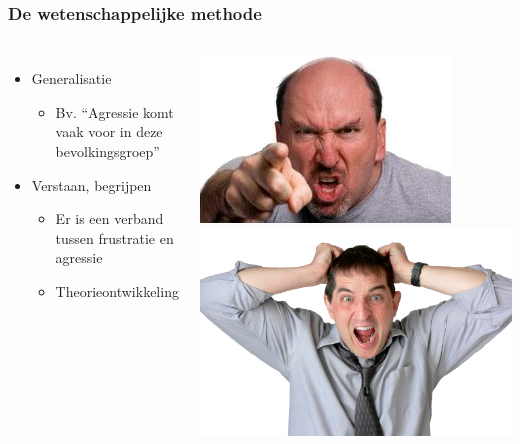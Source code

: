 \documentclass{beamer}
\begin{document}
\begin{frame}
  \frametitle{De wetenschappelijke methode}

  \begin{columns}[c]

    \begin{itemize}
      \item Generalisatie
        \begin{itemize}
          \item Bv. ``Agressie komt vaak voor in deze bevolkingsgroep''
        \end{itemize}
      \item Verstaan, begrijpen
        \begin{itemize}
          \item Er is een verband tussen frustratie en agressie
          \item Theorieontwikkeling
        \end{itemize}
    \end{itemize}

    \includegraphics[width=\textwidth]{img/les1-05}
    \vspace*{1cm}
    \includegraphics[width=\textwidth]{img/les1-06}

  \end{columns}
\end{frame}
\end{document}
